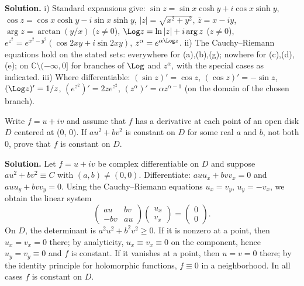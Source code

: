 \noindent\textbf{Solution.}
i) Standard expansions give: $\sin z=\sin x\cosh y+i\cos x\sinh y$, $\cos z=\cos x\cosh y-i\sin x\sinh y$, $|z|=\sqrt{x^2+y^2}$, $\bar z=x-iy$, $\arg z=\arctan(y/x)$ ($z\ne 0$), $\Log z=\ln|z|+i\arg z$ ($z\ne 0$), $e^{z^2}=e^{x^2-y^2}(\cos 2xy+i\sin 2xy)$, $z^{\alpha}=e^{\alpha\Log z}$.\newline
ii) The Cauchy–Riemann equations hold on the stated sets: everywhere for (a),(b),(g); nowhere for (c),(d),(e); on $\mathbb{C}\setminus(-\infty,0]$ for branches of $\Log$ and $z^{\alpha}$, with the special cases as indicated.\newline
iii) Where differentiable: $(\sin z)'=\cos z$, $(\cos z)'=-\sin z$, $(\Log z)'=1/z$, $(e^{z^2})'=2z e^{z^2}$, $(z^{\alpha})'=\alpha z^{\alpha-1}$ (on the domain of the chosen branch).

\begin{problembox}
Write \( f = u + iv \) and assume that \( f \) has a derivative at each point of an open disk \( D \) centered at (0, 0). If \( au^2 + bv^2 \) is constant on \( D \) for some real \( a \) and \( b \), not both 0, prove that \( f \) is constant on \( D \).
\end{problembox}

\noindent\textbf{Solution.}
Let $f=u+iv$ be complex differentiable on $D$ and suppose $au^2+bv^2\equiv C$ with $(a,b)\ne (0,0)$. Differentiate: $auu_x+bvv_x=0$ and $auu_y+bvv_y=0$. Using the Cauchy–Riemann equations $u_x=v_y$, $u_y=-v_x$, we obtain the linear system
\[\begin{pmatrix}au&bv\\ -bv&au\end{pmatrix}\begin{pmatrix}u_x\\ v_x\end{pmatrix}=\begin{pmatrix}0\\ 0\end{pmatrix}.\]
On $D$, the determinant is $a^2u^2+b^2v^2\ge 0$. If it is nonzero at a point, then $u_x=v_x=0$ there; by analyticity, $u_x\equiv v_x\equiv 0$ on the component, hence $u_y=v_y\equiv 0$ and $f$ is constant. If it vanishes at a point, then $u=v=0$ there; by the identity principle for holomorphic functions, $f\equiv 0$ in a neighborhood. In all cases $f$ is constant on $D$.

